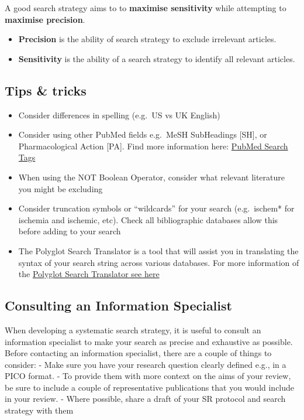 \documentclass[
]{book}
\providecommand{\tightlist}{%
  \setlength{\itemsep}{0pt}\setlength{\parskip}{0pt}}
\begin{document}
A good search strategy aims to to \textbf{maximise sensitivity} while attempting to \textbf{maximise precision}.

\begin{itemize}
\tightlist
\item
  \textbf{Precision} is the ability of search strategy to exclude irrelevant articles.
\item
  \textbf{Sensitivity} is the ability of a search strategy to identify all relevant articles.
\end{itemize}

\subsection{Tips \& tricks}\label{tips-tricks}

\begin{itemize}
\tightlist
\item
  Consider differences in spelling (e.g.~US vs UK English)
\item
  Consider using other PubMed fields e.g.~MeSH SubHeadings {[}SH{]}, or Pharmacological Action {[}PA{]}. Find more information here: \href{https://pubmed.ncbi.nlm.nih.gov/help/\#search-tags}{PubMed Search Tags}
\item
  When using the NOT Boolean Operator, consider what relevant literature you might be excluding
\item
  Consider truncation symbols or ``wildcards'' for your search (e.g.~ischem* for ischemia and ischemic, etc). Check all bibliographic databases allow this before adding to your search
\item
  The Polyglot Search Translator is a tool that will assist you in translating the syntax of your search string across various databases. For more information of the \href{https://sr-accelerator.com/\#/polyglot}{Polyglot Search Translator see here}
\end{itemize}

\subsection{Consulting an Information Specialist}\label{consulting-an-information-specialist}

When developing a systematic search strategy, it is useful to consult an information specialist to make your search as precise and exhaustive as possible. Before contacting an information specialist, there are a couple of things to consider:
- Make sure you have your research question clearly defined e.g., in a PICO format.
- To provide them with more context on the aims of your review, be sure to include a couple of representative publications that you would include in your review.
- Where possible, share a draft of your SR protocol and search strategy with them
\end{document}
